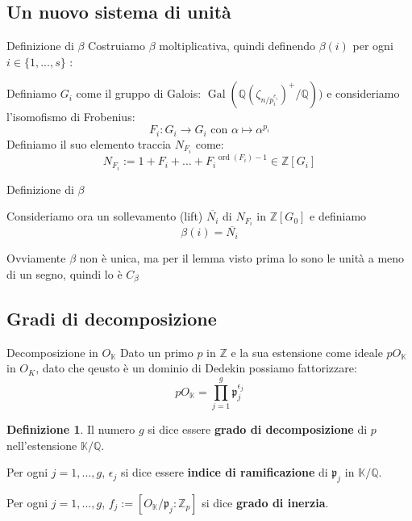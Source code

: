 \documentclass{beamer}
\theoremstyle{plain}
\theoremstyle{remark}
\theoremstyle{definition}
\newtheorem{deff}[teo]{Definizione}
\newcommand{\Z}{\mathbb{Z}}
\newcommand{\K}{\mathbb{K}}
\newcommand{\Q}{\mathbb{Q}}
\DeclareMathOperator{\Gal}{Gal}
\DeclareMathOperator{\ord}{ord}
\begin{document}
\subsection{Un nuovo sistema di unità}
	
	\begin{frame}{Definizione di $\beta$}
		Costruiamo $\beta$ moltiplicativa, quindi definendo $ \beta (i) $ per ogni $ i \in \{ 1 , ... , s\} $ :

		Definiamo $ G_i $ come il gruppo di Galois: $ \Gal ( \Q(\zeta_{n/p_i^{e_i}})^+ / \Q)) $ e consideriamo l'isomofismo di Frobenius:
		\[ F_i : G_i \to G_i \text{ con }  \alpha \mapsto \alpha ^ {p_i}\] \pause
		 Definiamo il suo elemento traccia $ N_{F_i} $ come:
		 \[ N_{F_i} := 1 + F_i + ... + {F_i}^{\ord (F_i) - 1} \in  \Z [G_i] \] 
	\end{frame}
	
	\begin{frame}{Definizione di $\beta$}
		\begin{block}{}
				 Consideriamo ora un sollevamento (lift) $ \overline{N_i} $ di $ N_{F_i} $ in $ \Z[G_0] $ e definiamo
				 \[ \beta (i) =  \overline{N_i} \]
		\end{block}\pause
			 
		Ovviamente $\beta$ non è unica, ma per il lemma visto prima lo sono le unità a meno di un segno, quindi lo è $ C_\beta $
	\end{frame}
	
\subsection{Gradi di decomposizione}
	
	\begin{frame}{Decomposizione in $ O_\K $}
		Dato un primo $ p $ in $ \Z $ e la sua estensione come ideale $ pO_\K $ in $ O_K $, dato che qeusto è un dominio di Dedekin possiamo fattorizzare:
			\begin{equation}\label{eq:fact_p}
				pO_\K = \prod_{j=1}^g \mathfrak{p}_j^{\epsilon _j}
			\end{equation} 
			\pause
			\begin{deff} \label{def:degree}
				Il numero $ g $ si dice essere \textbf{grado di decomposizione} di $ p $ nell'estensione $ \K / \Q $.
				
				Per ogni $ j=1, ..., g $, $ \epsilon _j $ si dice essere \textbf{indice di ramificazione} di $ \mathfrak{p}_j $ in $ \K / \Q $.
				
				Per ogni $ j=1, ..., g $, $ f_j := [O_\K / \mathfrak{p}_j : \Z_p ] $ si dice \textbf{grado di inerzia}.
			\end{deff}
	\end{frame}
\end{document}
